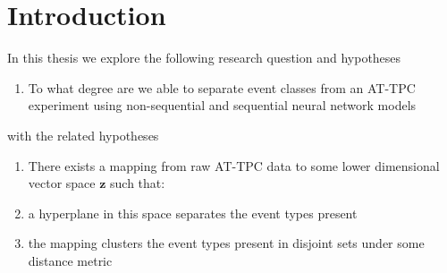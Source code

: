 \chapter{Introduction}\label{ch:introduction}

In this thesis we explore the following research question and hypotheses 

\begin{enumerate}[start=0, label={(\bfseries R\arabic*):}]
\item To what degree are we able to separate event classes from an AT-TPC experiment using non-sequential and sequential neural network models 
\end{enumerate}

\noindent with the related hypotheses 

\begin{enumerate}[start=0, label={(\bfseries H\arabic*):}]
\item[] There exists a mapping from raw AT-TPC data to some lower dimensional vector space $\mathbf{z}$ such that: 
\item a hyperplane in this space separates the event types present
\item the mapping clusters the event types present in disjoint sets under some distance metric
\end{enumerate}